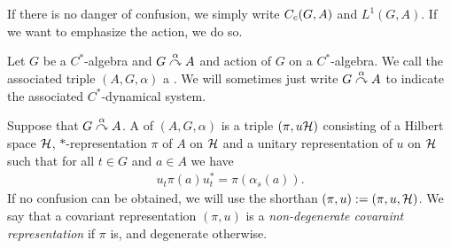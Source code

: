 \begin{remark}
	If there is no danger of confusion, we simply write $C_c(G,A)$ and $L^1(G,A)$. If we want to emphasize the action, we do so.
\end{remark}
\begin{definition}
	Let $G$ be a $C^*$-algebra and $G \stackrel{\alpha}{\curvearrowright} A$ and action of $G$ on a $C^*$-algebra. We call the associated triple $(A,G,\alpha)$ a . We will sometimes just write $G \stackrel{\alpha}{\curvearrowright} A$ to indicate the associated $C^*$-dynamical system.
\end{definition}
\begin{definition}
	Suppose that $G \stackrel{\alpha}{\curvearrowright} A$. A  of $(A,G,\alpha)$ is a triple $(\pi,u\mathcal{H})$ consisting of a Hilbert space $\mathcal{H}$, $*$-representation $\pi$ of $A$ on $\mathcal{H}$ and a unitary representation of $u$ on $\mathcal{H}$ such that for all $t \in G$ and $a \in A$ we have
	\begin{align*}
		u_t \pi(a) u_t^* = \pi(\alpha_s(a)).
	\end{align*}
	If no confusion can be obtained, we will use the shorthan $(\pi,u):= (\pi,u,\mathcal{H})$. We say that a covariant representation $(\pi,u)$ is a \textit{non-degenerate covaraint representation} if $\pi$ is, and degenerate otherwise.
\end{definition}


